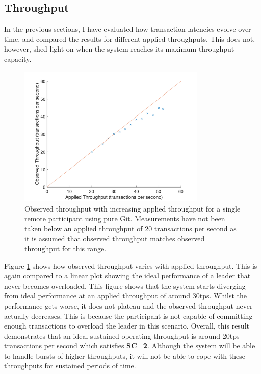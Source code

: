 \documentclass[12pt,a4paper,twoside,openright]{report}
\begin{document}
	\subsection{Throughput}
	In the previous sections, I have evaluated how transaction latencies evolve over time, and compared the results for different applied throughputs.
	This does not, however, shed light on when the system reaches its maximum throughput capacity.
	\begin{figure}
		\centering
		\includegraphics[width=0.8\textwidth] {figs/appliedvsobservedsingle.png}
		\caption{Observed throughput with increasing applied throughput for a single remote participant using pure Git. Measurements have not been taken below an applied throughput of 20 transactions per second as it is assumed that observed throughput matches observed throughput for this range.}
		\label{figs:appliedobservedsingle}
	\end{figure}
	Figure \ref{figs:appliedobservedsingle} shows how observed throughput varies with applied throughput. 
	This is again compared to a linear plot showing the ideal performance of a leader that never becomes overloaded.
	This figure shows that the system starts diverging from ideal performance at an applied throughput of around 30tps.
	Whilst the performance gets worse, it does not plateau and the observed throughput never actually decreases.
	This is because the participant is not capable of committing enough transactions to overload the leader in this scenario.
	Overall, this result demonstrates that an ideal sustained operating throughput is around 20tps transactions per second which satisfies \textbf{SC\_2}.
	Although the system will be able to handle bursts of higher throughputs, it will not be able to cope with these throughputs for sustained periods of time.
\end{document}

